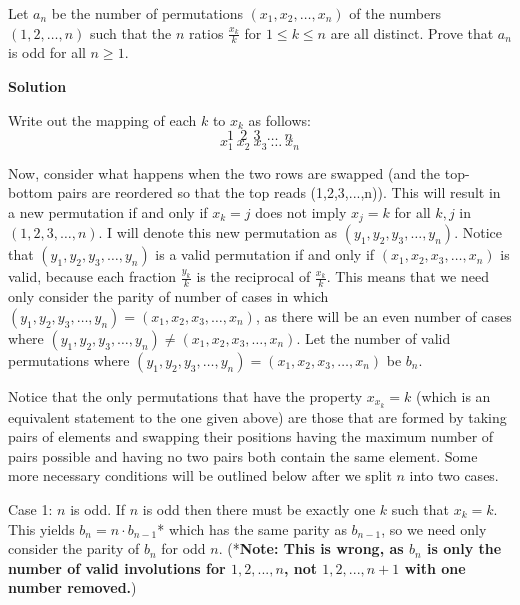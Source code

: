 \begin{enumerate}
 Let $a_n$ be the number of permutations $(x_1, x_2, \dots, x_n)$ of the numbers $(1,2,\dots, n)$ such that the $n$ ratios $\frac{x_k}{k}$ for $1\le k\le n$ are all distinct. Prove that $a_n$ is odd for all $n\ge 1.$




\textbf{Solution}

Write out the mapping of each $k$ to $x_k$ as follows:
 \[1\ \ 2\ \ 3\ \ \dots \ \ n\]
 \[x_1\ x_2\ x_3\ \dots \ x_n\]

 Now, consider what happens when the two rows are swapped (and the top-bottom pairs are reordered so that the top reads (1,2,3,...,n)).  This will result in a new permutation if and only if $x_k = j$ does not imply $x_j = k$ for all $k,j$ in $(1,2,3,\dots,n)$.  I will denote this new permutation as $(y_1,y_2,y_3,\dots,y_n)$.  Notice that $(y_1,y_2,y_3,\dots,y_n)$ is a valid permutation if and only if $(x_1,x_2,x_3,\dots,x_n)$ is valid, because each fraction $\frac{y_k}{k}$ is the reciprocal of $\frac{x_k}{k}$.  This means that we need only consider the parity of number of cases in which $(y_1,y_2,y_3,\dots, y_n) = (x_1,x_2,x_3,\dots, x_n)$, as there will be an even number of cases where $(y_1,y_2,y_3,\dots, y_n) \ne (x_1,x_2,x_3,\dots, x_n)$.  Let the number of valid permutations where $(y_1,y_2,y_3,\dots, y_n) = (x_1,x_2,x_3,\dots, x_n)$ be $b_n$.

 Notice that the only permutations that have the property $x_{x_k}=k$ (which is an equivalent statement to the one given above) are those that are formed by taking pairs of elements and swapping their positions having the maximum number of pairs possible and having no two pairs both contain the same element.  Some more necessary conditions will be outlined below after we split $n$ into two cases.

 
Case 1:  $n$ is odd.  If $n$ is odd then there must be exactly one $k$ such that $x_k = k$.  This yields $b_n=n\cdot b_{n-1}$* which has the same parity as $b_{n-1}$, so we need only consider the parity of $b_n$ for odd $n$. (*\textbf{Note: This is wrong, as $b_n$ is only the number of valid involutions for $1,2,...,n$, not $1,2,...,n+1$ with one number removed.})


\end{enumerate}
